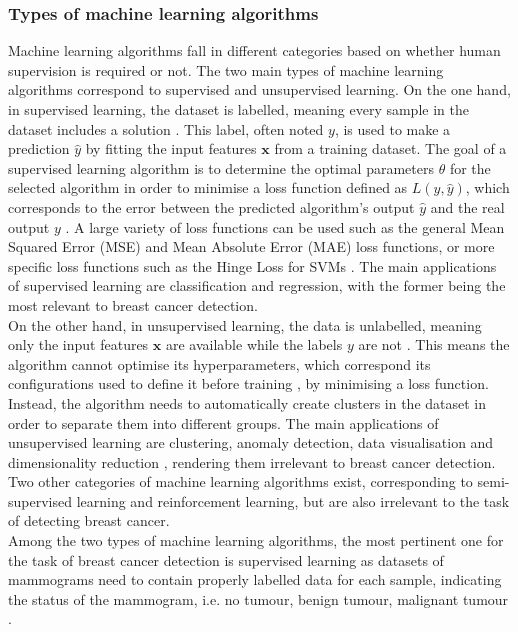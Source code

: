 \subsubsection{Types of machine learning algorithms}

Machine learning algorithms fall in different categories based on whether human supervision is required or not. The two main types of machine learning algorithms correspond to supervised and unsupervised learning. On the one hand, in supervised learning, the dataset is labelled, meaning every sample in the dataset includes a solution \citep{Geron2019}. This label, often noted $y$, is used to make a prediction $\hat{y}$ by fitting the input features $\textbf{x}$ from a training dataset. The goal of a supervised learning algorithm is to determine the optimal parameters $\theta$ for the selected algorithm in order to minimise a loss function defined as $L(y,\hat{y})$, which corresponds to the error between the predicted algorithm's output $\hat{y}$ and the real output $y$ \citep{Litjens2017}. A large variety of loss functions can be used such as the general Mean Squared Error (MSE) and Mean Absolute Error (MAE) loss functions, or more specific loss functions such as the Hinge Loss for SVMs \citep{Geron2019}. The main applications of supervised learning are classification and regression, with the former being the most relevant to breast cancer detection.\\

On the other hand, in unsupervised learning, the data is unlabelled, meaning only the input features $\textbf{x}$ are available while the labels $y$ are not \citep{Litjens2017}. This means the algorithm cannot optimise its hyperparameters, which correspond its configurations used to define it before training \citep{Bergstra2013}, by minimising a loss function. Instead, the algorithm needs to automatically create clusters in the dataset in order to separate them into different groups. The main applications of unsupervised learning are clustering, anomaly detection, data visualisation and dimensionality reduction \citep{Geron2019}, rendering them irrelevant to breast cancer detection. Two other categories of machine learning algorithms exist, corresponding to semi-supervised learning and reinforcement learning, but are also irrelevant to the task of detecting breast cancer.\\

Among the two types of machine learning algorithms, the most pertinent one for the task of breast cancer detection is supervised learning as datasets of mammograms need to contain properly labelled data for each sample, indicating the status of the mammogram, i.e. no tumour, benign tumour, malignant tumour \citep{Shen2017}.

